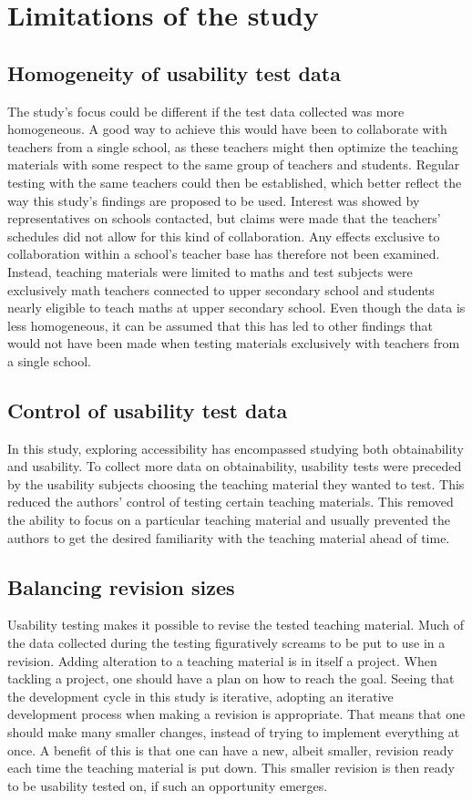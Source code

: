 \section{Limitations of the study}
\subsection{Homogeneity of usability test data}
The study's focus could be different if the test data collected was more homogeneous. A good way to achieve this would have been to collaborate with teachers from a single school, as these teachers might then optimize the teaching materials with some respect to the same group of teachers and students. Regular testing with the same teachers could then be established, which better reflect the way this study's findings are proposed to be used. Interest was showed by representatives on schools contacted, but claims were made that the teachers' schedules did not allow for this kind of collaboration. 
Any effects exclusive to collaboration within a school's teacher base has therefore not been examined. Instead, teaching materials were limited to maths and test subjects were exclusively math teachers connected to upper secondary school and students nearly eligible to teach maths at upper secondary school. Even though the data is less homogeneous, it can be assumed that this has led to other findings that would not have been made when testing materials exclusively with teachers from a single school.

\subsection{Control of usability test data}
In this study, exploring accessibility has encompassed studying both obtainability and usability. To collect more data on obtainability, usability tests were preceded by the usability subjects choosing the teaching material they wanted to test. This reduced the authors' control of testing certain teaching materials. 
This removed the ability to focus on a particular teaching material and usually prevented the authors to get the desired familiarity with the teaching material ahead of time.

\subsection{Balancing revision sizes}
Usability testing makes it possible to revise the tested teaching material. Much of the data collected during the testing figuratively screams to be put to use in a revision. Adding alteration to a teaching material is in itself a project. When tackling a project, one should have a plan on how to reach the goal. Seeing that the development cycle in this study is iterative, adopting an iterative development process when making a revision is appropriate. 
That means that one should make many smaller changes, instead of trying to implement everything at once. A benefit of this is that one can have a new, albeit smaller, revision ready each time the teaching material is put down. This smaller revision is then ready to be usability tested on, if such an opportunity emerges. 

